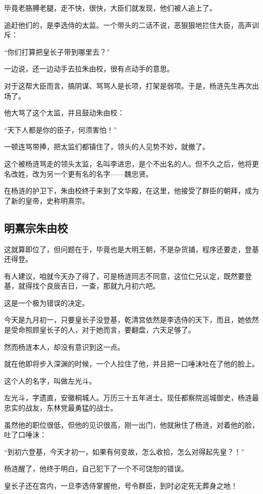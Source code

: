 \begin{multicols}{\theparacolNo}
		毕竟老胳膊老腿，走不快，很快，大臣们就发现，他们被人追上了。

		追赶他们的，是李选侍的太监。一个带头的二话不说，恶狠狠地拦住大臣，高声训斥：

		“你们打算把皇长子带到哪里去？”

		一边说，还一边动手去拉朱由校，很有点动手的意思。

		对于这帮大臣而言，搞阴谋、骂骂人是长项，打架是弱项。于是，杨涟先生再次出场了。

		他大骂了这个太监，并且鼓动朱由校：

		“天下人都是你的臣子，何须害怕！”

		一顿连骂带捧，把太监们都镇住了，领头的人见势不妙，就撤了。

		这个被杨涟骂走的领头太监，名叫李进忠，是个不出名的人。但不久之后，他将更名改姓，改为另一个更有名的名字——魏忠贤。

		在杨涟的护卫下，朱由校终于来到了文华殿，在这里，他接受了群臣的朝拜，成为了新的皇帝，史称明熹宗。

		\subsection{明熹宗朱由校}
		这就算即位了，但问题在于，毕竟也是大明王朝，不是杂货铺，程序还要走，登基还得登。

		有人建议，咱就今天办了得了，可是杨涟同志不同意，这位仁兄认定，既然要登基，就得找个良辰吉日，一查，那就九月初六吧。

		这是一个极为错误的决定。

		今天是九月初一，只要皇长子没登基，乾清宫依然是李选侍的天下，而且，她依然是受命照顾皇长子的人，对于她而言，要翻盘，六天足够了。

		然而杨涟本人，却没有意识到这一点。

		就在他即将步入深渊的时候，一个人拉住了他，并且把一口唾沫吐在了他的脸上。

		这个人的名字，叫做左光斗。

		左光斗，字遗直，安徽桐城人。万历三十五年进士。现任都察院巡城御史，杨涟最忠实的战友，东林党最勇猛的战士。

		虽然他的职位很低，但他的见识很高，刚一出门，他就揪住了杨涟，对着他的脸，吐了口唾沫：

		“到初六登基，今天才初一，如果有何变故，怎么收拾，怎么对得起先皇？！”

		杨涟醒了，他终于明白，自己犯下了一个不可饶恕的错误。

		皇长子还在宫内，一旦李选侍掌握他，号令群臣，到时必定死无葬身之地！


\end{multicols}

